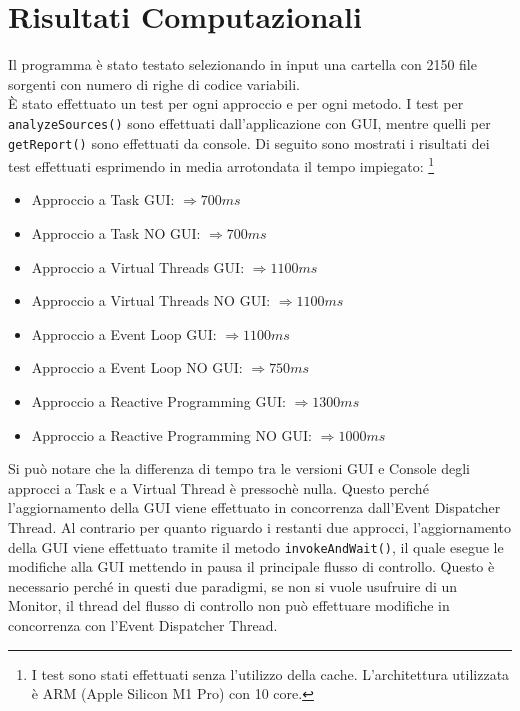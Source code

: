 \documentclass{article}
\begin{document}
    \section{Risultati Computazionali}
    Il programma è stato testato selezionando in input una cartella con 2150 file sorgenti con numero di righe di codice variabili.
    \\
    È stato effettuato un test per ogni approccio e per ogni metodo. I test per \texttt{analyzeSources()} sono effettuati dall'applicazione con GUI, mentre quelli per \texttt{getReport()} sono effettuati da console.
    Di seguito sono mostrati i risultati dei test effettuati  esprimendo in media arrotondata il tempo impiegato:
    \footnote{I test sono stati effettuati senza l'utilizzo della cache. L'architettura utilizzata è ARM (Apple Silicon M1 Pro) con 10 core.}
    \begin{itemize}
        \item Approccio a Task GUI: $\Rightarrow 700 ms$
        \item Approccio a Task NO GUI: $\Rightarrow 700 ms$
        \item Approccio a Virtual Threads GUI: $\Rightarrow 1100 ms$
        \item Approccio a Virtual Threads NO GUI: $\Rightarrow 1100 ms$
        \item Approccio a Event Loop GUI: $\Rightarrow 1100 ms$
        \item Approccio a Event Loop NO GUI: $\Rightarrow 750 ms$
        \item Approccio a Reactive Programming GUI: $\Rightarrow 1300 ms$
        \item Approccio a Reactive Programming NO GUI: $\Rightarrow 1000 ms$
    \end{itemize}

    Si può notare che la differenza di tempo tra le versioni GUI e Console degli approcci a Task e a Virtual Thread è pressochè nulla. Questo perché l'aggiornamento della GUI viene effettuato in concorrenza dall'Event Dispatcher Thread.
    Al contrario per quanto riguardo i restanti due approcci, l'aggiornamento della GUI viene effettuato tramite il metodo \texttt{invokeAndWait()}, il quale esegue le modifiche alla GUI mettendo in pausa il principale flusso di controllo. Questo è necessario perché in questi due paradigmi, se non si vuole usufruire di un Monitor, il thread del flusso di controllo non può effettuare modifiche in concorrenza con l'Event Dispatcher Thread.


    \clearpage
\end{document}
